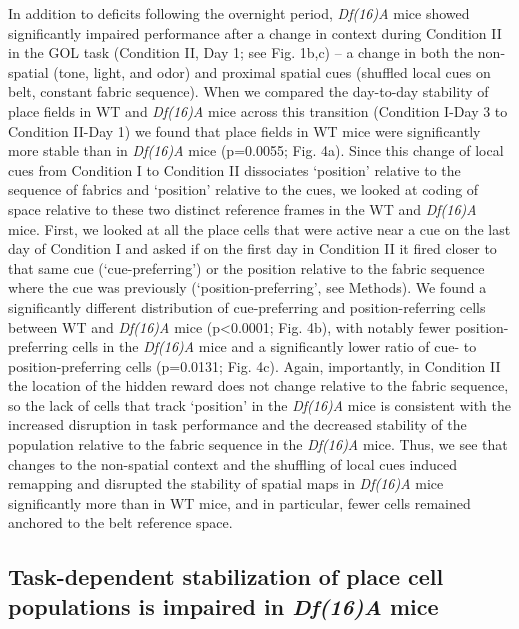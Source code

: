 In addition to deficits following the overnight period, \emph{Df(16)A\super{+/-}} mice showed significantly impaired performance after a change in context during Condition II in the GOL task (Condition II, Day 1; see Fig. 1b,c) – a change in both the non-spatial (tone, light, and odor) and proximal spatial cues (shuffled local cues on belt, constant fabric sequence). When we compared the day-to-day stability of place fields in WT and \emph{Df(16)A\super{+/-}} mice across this transition (Condition I-Day 3 to Condition II-Day 1) we found that place fields in WT mice were significantly more stable than in \emph{Df(16)A\super{+/-}} mice (p=0.0055; Fig. 4a). Since this change of local cues from Condition I to Condition II dissociates ‘position’ relative to the sequence of fabrics and ‘position’ relative to the cues, we looked at coding of space relative to these two distinct reference frames in the WT and \emph{Df(16)A\super{+/-}} mice. First, we looked at all the place cells that were active near a cue on the last day of Condition I and asked if on the first day in Condition II it fired closer to that same cue (‘cue-preferring’) or the position relative to the fabric sequence where the cue was previously (‘position-preferring’, see Methods). We found a significantly different distribution of cue-preferring and position-referring cells between WT and \emph{Df(16)A\super{+/-}} mice (p<0.0001; Fig. 4b), with notably fewer position-preferring cells in the \emph{Df(16)A\super{+/-}} mice and a significantly lower ratio of cue- to position-preferring cells (p=0.0131; Fig. 4c). Again, importantly, in Condition II the location of the hidden reward does not change relative to the fabric sequence, so the lack of cells that track ‘position’ in the \emph{Df(16)A\super{+/-}} mice is consistent with the increased disruption in task performance and the decreased stability of the population relative to the fabric sequence in the \emph{Df(16)A\super{+/-}} mice. Thus, we see that changes to the non-spatial context and the shuffling of local cues induced remapping and disrupted the stability of spatial maps in \emph{Df(16)A\super{+/-}} mice significantly more than in WT mice, and in particular, fewer cells remained anchored to the belt reference space.

\subsection{Task-dependent stabilization of place cell populations is impaired in \emph{Df(16)A\super{+/-}} mice}

